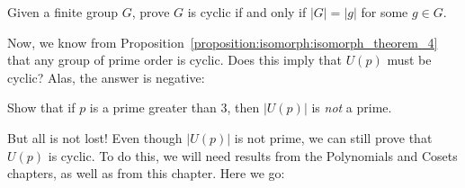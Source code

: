 \begin{exercise}{}
Given a finite group $G$, prove $G$ is cyclic if and only if $|G| = |g|$ for some $g \in G$.
\end{exercise} 

Now, we know from Proposition~\ref{proposition:isomorph:isomorph_theorem_4} that any group of prime order is cyclic. Does this imply that $U(p)$ must be cyclic?  Alas, the answer is negative:

\begin{exercise}{}
Show that if $p$ is a prime greater than 3, then $|U(p)|$ is \emph{not} a prime.
\end{exercise}

But all is not lost! Even though  $|U(p)|$ is not prime, we can still prove that $U(p)$ is cyclic. To do this, we will need results from the Polynomials and Cosets chapters, as well as from this chapter. Here we go:


